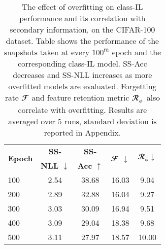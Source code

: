 \documentclass[final]{cvpr}
\newcommand{\cfr}{$\mathbfcal{R}_{\phi}$} \newcommand\todo[1]{(\textcolor{red}{TODO: #1})}
\begin{document}
\begin{table}[!t]
\centering
\begin{tabular}{|l@{\hskip3pt}|c@{\hskip3pt}|c@{\hskip3pt}|c|@{\hskip3pt}c@{\hskip3pt}|}
    \hline
    \multirow{2}{*}{\textbf{Epoch}}& \textbf{SS-\hspace{5px}} & \textbf{SS-\hspace{5px}} & \multirow{2}{*}{$\mathbfcal{F}$ $\downarrow$} & \multirow{2}{*}{\cfr $\downarrow$}   \\ & \textbf{NLL} $\downarrow$ & \textbf{Acc} $\uparrow$ & &  \\
        \hline
        \hline
      100 & 2.54    & 38.68 & 16.03  &  9.04  \\
      200 & 2.89    & 32.88 & 16.04  &  9.27 \\
      300 & 3.03    & 30.09 & 16.94  &  9.51 \\
      400 & 3.09    & 29.04 & 18.38  &  9.68 \\
      500 & 3.11    & 27.97 & 18.57  &  10.00 \\
        \hline
\end{tabular}
\caption{The effect of overfitting on class-IL performance and its correlation with secondary information, on the CIFAR-100 dataset. Table shows the performance of the snapshots taken at every $100^{th}$ epoch and the corresponding class-IL model.
SS-Acc decreases and SS-NLL increases as more overfitted models are evaluated. Forgetting rate $\mathbfcal{F}$ and feature retention metric \cfr~also correlate with overfitting. Results are averaged over 5 runs, standard deviation is reported in Appendix.}
\label{tab:overfit_forgetting}
\end{table}
\end{document}

